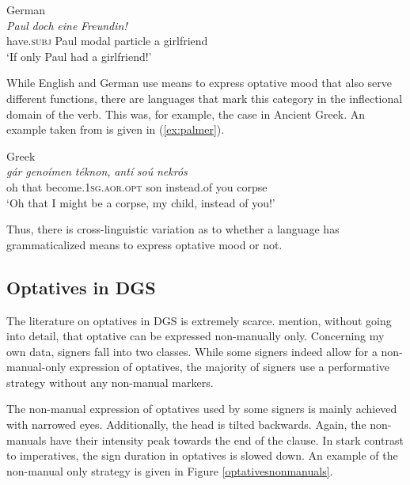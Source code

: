\begin{exe}
\ex German \\  {\textit{Paul}} {\textit{doch}} {\textit{eine}} {\textit{Freundin!}}   \\
{have.\textsc{subj}} {Paul} {modal particle} {a} {girlfriend}\\
\trans `If only Paul had a girlfriend!' \label{ex:optativegermansubjunctive}
\end{exe}

\noindent While English and German use means to express optative mood that also serve different functions, there are languages that mark this category in the inflectional domain of the verb. This was, for example, the case in Ancient Greek. An example taken from \citet[216]{palmer2001mood} is given in (\ref{ex:palmer}).

\begin{exe}
\ex Greek \citep[216]{palmer2001mood} \\  {\textit{gár}} {\textit{genoíme\textlengthmark n}} {\textit{téknon,}} {\textit{antí}} {\textit{soú}} {\textit{nekrós}}          \\
{oh} {that} {become.1\textsc{sg.aor.opt}} {son} {instead.of} {you} {corpse}  \\
\trans `Oh that I might be a corpse, my child, instead of you!' \label{ex:palmer}
\end{exe}

\noindent Thus, there is cross-linguistic variation as to whether a language has grammaticalized means to express optative mood or not.

\subsection{Optatives in DGS}
The literature on optatives in DGS is extremely scarce. \citet[366]{happ2014vork} mention, without going into detail, that optative can be expressed non-manually only. Concerning my own data, signers fall into two classes. While some signers indeed allow for a non-manual-only expression of optatives, the majority of signers use a performative strategy without any non-manual markers.

The non-manual expression of optatives used by some signers is mainly achieved with narrowed eyes. Additionally, the head is tilted backwards. Again, the non-manuals have their intensity peak towards the end of the clause. In stark contrast to imperatives, the sign duration in optatives is slowed down.  An example of the non-manual only strategy is given in Figure \ref{optativesnonmanuals}.  

